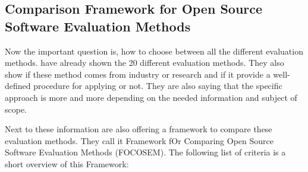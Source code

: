 \documentclass[DIV=calc,paper=a4,fontsize=9pt,twocolumn]{scrartcl}
\begin{document}
\subsection{Comparison Framework for Open Source Software Evaluation Methods}

Now the important question is, how to choose between all the different evaluation methods. \citet{stol2010comparison} have already shown the 20 different evaluation methods. They also show if these method comes from industry or research and if it provide a well-defined procedure for applying or not. They are also saying that the specific approach is more and more depending on the needed information and subject of scope. 

Next to these information \citet{stol2010comparison} are also offering a framework to compare these evaluation methods. They call it Framework fOr Comparing Open Source Software Evaluation Methods (FOCOSEM). The following list of criteria is a short overview of this Framework:
\end{document}
